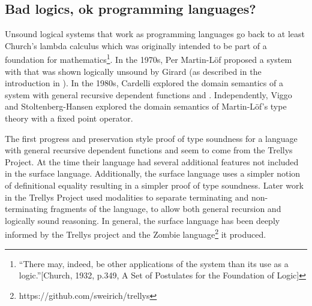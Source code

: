 \subsection{Bad logics, ok programming languages?}

Unsound logical systems that work as programming languages go back to at least Church's lambda calculus which was originally intended to be part of a foundation for mathematics\footnote{``There may, indeed, be other applications of the system than its use as a logic.''{[}Church, 1932, p.349, A Set of Postulates for the Foundation of Logic{]}}.
In the 1970s, Per Martin-L{\"o}f proposed a system with \tit{} that was shown logically unsound by Girard (as described in the introduction in \cite{Martin-Lof-1972}).
In the 1980s, Cardelli explored the domain semantics of a system with general recursive dependent functions and \tit{}\cite{cardelli1986polymorphic}.
Independently, Viggo and Stoltenberg-Hansen\cite{PALMGREN1990135} explored the domain semantics of Martin-L{\"o}f's type theory with a fixed point operator.

The first progress and preservation style proof of type soundness for a language with general recursive dependent functions and \tit{} seem to come from the Trellys Project\cite{sjoberg2012irrelevance}.
At the time their language had several additional features not included in the surface language.
Additionally, the surface language uses a simpler notion of definitional equality resulting in a simpler proof of type soundness.
Later work in the Trellys Project\cite{casinghino2014combining,casinghino2014combiningthesis} used modalities to separate terminating and non-terminating fragments of the language, to allow both general recursion and logically sound reasoning.%
In general, the surface language has been deeply informed by the Trellys project\cite{sjoberg2012irrelevance,casinghino2014combining,casinghino2014combiningthesis,sjoberg2015programming,sjoberg2015dependently} and the Zombie language\footnote{https://github.com/sweirich/trellys} it produced.


